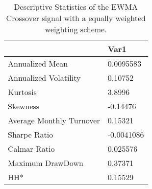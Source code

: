 \begin{table}[H]
\centering
\begin{tabular}{ll}
\hline& Var1 \\ 
\hline 
Annualized Mean & 0.0095583 \\ 
Annualized Volatility & 0.10752 \\ 
Kurtosis & 3.8996 \\ 
Skewness & -0.14476 \\ 
Average Monthly Turnover & 0.15321 \\ 
Sharpe Ratio & -0.0041086 \\ 
Calmar Ratio & 0.025576 \\ 
Maximum DrawDown & 0.37371 \\ 
HH* & 0.15529 \\ 
\hline
\end{tabular}
\caption{Descriptive Statistics of the EWMA Crossover signal with a equally weighted weighting scheme.}
\label{MBBSEWNR}
\end{table}